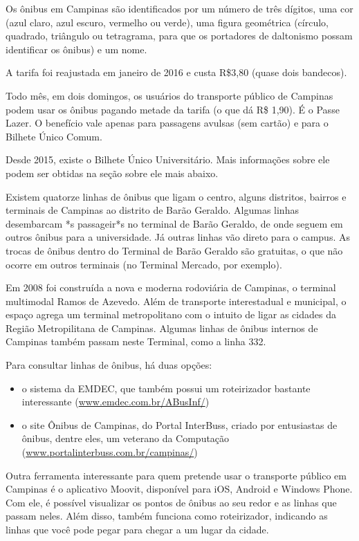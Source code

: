 Os ônibus em Campinas são identificados por um número de três dígitos, uma cor
(azul claro, azul escuro, vermelho ou verde), uma figura geométrica (círculo,
quadrado, triângulo ou tetragrama, para que os portadores de daltonismo possam
identificar os ônibus) e um nome.

A tarifa foi reajustada em janeiro de 2016 e custa R\$3,80 (quase dois bandecos).

Todo mês, em dois domingos, os usuários do transporte público de Campinas podem
usar os ônibus pagando metade da tarifa (o que dá R\$ 1,90). É o Passe Lazer. O
benefício vale apenas para passagens avulsas (sem cartão) e para o Bilhete
Único Comum.

Desde 2015, existe o Bilhete Único Universitário. Mais informações sobre ele
podem ser obtidas na seção sobre ele mais abaixo.

Existem quatorze linhas de ônibus que ligam o centro, alguns distritos, bairros
e terminais de Campinas ao distrito de Barão Geraldo. Algumas linhas desembarcam
*s passageir*s no terminal de Barão Geraldo, de onde seguem em outros ônibus
para a universidade. Já outras linhas vão direto para o campus. As trocas de
ônibus dentro do Terminal de Barão Geraldo são gratuitas, o que não ocorre em
outros terminais (no Terminal Mercado, por exemplo).

Em 2008 foi construída a nova e moderna rodoviária de Campinas, o terminal
multimodal Ramos de Azevedo. Além de transporte interestadual e municipal, o
espaço agrega um terminal metropolitano com o intuito de ligar as cidades da
Região Metropilitana de Campinas. Algumas linhas de ônibus internos de Campinas
também passam neste Terminal, como a linha 332.

Para consultar linhas de ônibus, há duas opções:
\begin{itemize}
  \item o sistema da EMDEC, que também possui um roteirizador bastante
interessante (\url{www.emdec.com.br/ABusInf/})
  \item o site Ônibus de Campinas, do Portal InterBuss, criado por entusiastas
de ônibus, dentre eles, um veterano da Computação
(\url{www.portalinterbuss.com.br/campinas/})
\end{itemize}

Outra ferramenta interessante para quem pretende usar o transporte público em
Campinas é o aplicativo Moovit, disponível para iOS, Android e Windows
Phone. Com ele, é possível visualizar os pontos de ônibus ao seu redor e as
linhas que passam neles. Além disso, também funciona como roteirizador,
indicando as linhas que você pode pegar para chegar a um lugar da cidade.

